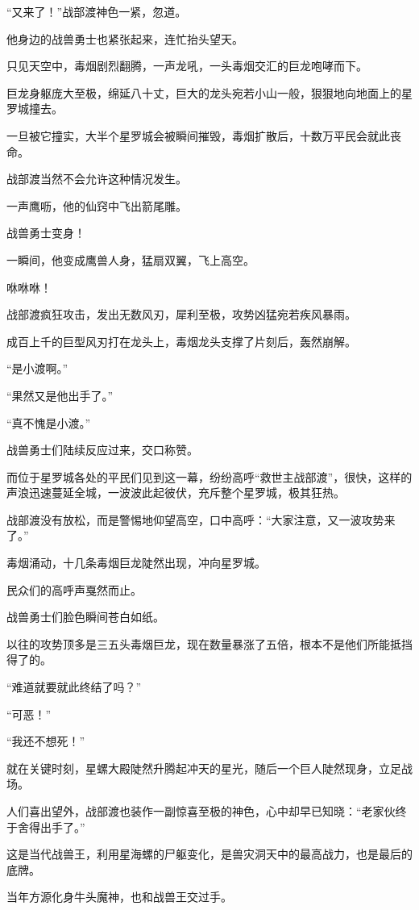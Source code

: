 \begin{this_body}
“又来了！”战部渡神色一紧，忽道。

他身边的战兽勇士也紧张起来，连忙抬头望天。

只见天空中，毒烟剧烈翻腾，一声龙吼，一头毒烟交汇的巨龙咆哮而下。

巨龙身躯庞大至极，绵延八十丈，巨大的龙头宛若小山一般，狠狠地向地面上的星罗城撞去。

一旦被它撞实，大半个星罗城会被瞬间摧毁，毒烟扩散后，十数万平民会就此丧命。

战部渡当然不会允许这种情况发生。

一声鹰呖，他的仙窍中飞出箭尾雕。

战兽勇士变身！

一瞬间，他变成鹰兽人身，猛扇双翼，飞上高空。

咻咻咻！

战部渡疯狂攻击，发出无数风刃，犀利至极，攻势凶猛宛若疾风暴雨。

成百上千的巨型风刃打在龙头上，毒烟龙头支撑了片刻后，轰然崩解。

“是小渡啊。”

“果然又是他出手了。”

“真不愧是小渡。”

战兽勇士们陆续反应过来，交口称赞。

而位于星罗城各处的平民们见到这一幕，纷纷高呼“救世主战部渡”，很快，这样的声浪迅速蔓延全城，一波波此起彼伏，充斥整个星罗城，极其狂热。

战部渡没有放松，而是警惕地仰望高空，口中高呼：“大家注意，又一波攻势来了。”

毒烟涌动，十几条毒烟巨龙陡然出现，冲向星罗城。

民众们的高呼声戛然而止。

战兽勇士们脸色瞬间苍白如纸。

以往的攻势顶多是三五头毒烟巨龙，现在数量暴涨了五倍，根本不是他们所能抵挡得了的。

“难道就要就此终结了吗？”

“可恶！”

“我还不想死！”

就在关键时刻，星螺大殿陡然升腾起冲天的星光，随后一个巨人陡然现身，立足战场。

人们喜出望外，战部渡也装作一副惊喜至极的神色，心中却早已知晓：“老家伙终于舍得出手了。”

这是当代战兽王，利用星海螺的尸躯变化，是兽灾洞天中的最高战力，也是最后的底牌。

当年方源化身牛头魔神，也和战兽王交过手。


\end{this_body}
